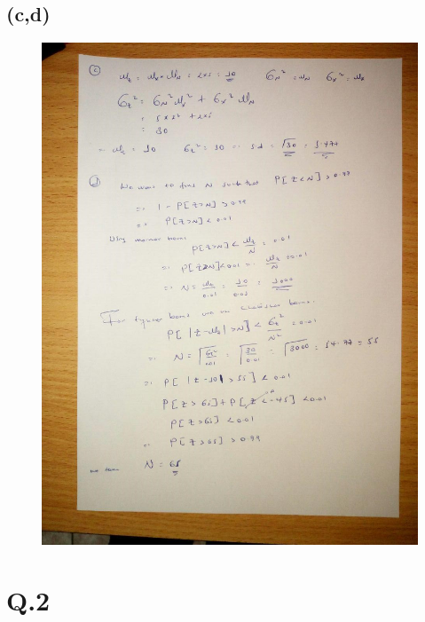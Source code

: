 \documentclass[a4paper,11pt]{article}
\begin{document}
\subsection*{(c,d)}
\begin{figure}[h]
  \centering
   \includegraphics[scale=0.45]{q1_c}
\end{figure}
\clearpage
\newpage
\section*{Q.2}
\end{document}
